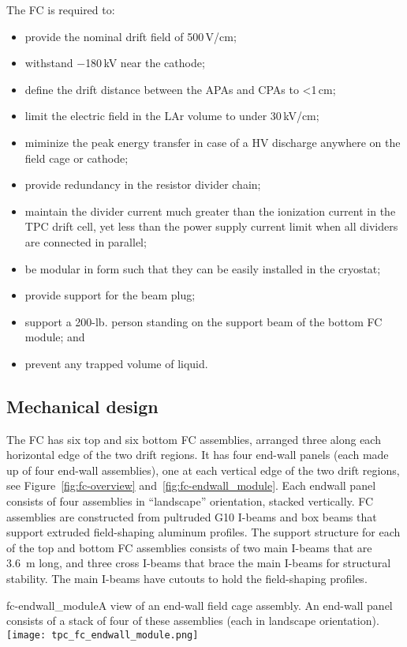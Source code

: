 The FC is required to:
\begin{itemize}
\item provide the nominal drift field of 500\,V/cm;
\item withstand $-$180\,kV near the cathode;
\item define the drift distance between the APAs and CPAs to <1\,cm;
\item limit the electric field in the LAr volume to under 30\,kV/cm;
\item miminize the peak energy transfer in case of a HV discharge anywhere on the field cage or cathode;
\item provide redundancy in the resistor divider chain;
\item maintain the divider current much greater than the ionization current in the TPC drift cell, yet less than the power supply current limit when all dividers are connected in parallel;
\item be modular in form such that they can be easily installed in the cryostat;
\item provide support for the beam plug; 
\item support a 200-lb. person standing on the support beam of the bottom FC module; and
\item prevent any trapped volume of liquid.
\end{itemize}

\subsection{Mechanical design}

The FC has six top and six bottom FC assemblies, arranged three along each horizontal edge of the two drift regions. It has 
four end-wall panels (each made up of four end-wall assemblies), one at each vertical edge of the two drift regions, see Figure~\ref{fig:fc-overview} and~\ref{fig:fc-endwall_module}.
Each endwall panel consists of four assemblies in ``landscape'' orientation, stacked vertically.
FC assemblies are constructed from pultruded G10 I-beams and box beams that support extruded field-shaping aluminum profiles. The support structure for each of the top and bottom FC assemblies consists of two main I-beams that are 3.6~m long, and three cross I-beams that brace the main I-beams for structural stability. The main I-beams have cutouts to hold the field-shaping profiles. 

\begin{cdrfigure}{fc-endwall_module}{A view of an end-wall field cage assembly. An end-wall panel consists of a stack of four of these assemblies (each in landscape orientation).}
\texttt{[image: tpc\_fc\_endwall\_module.png]}
\end{cdrfigure}

